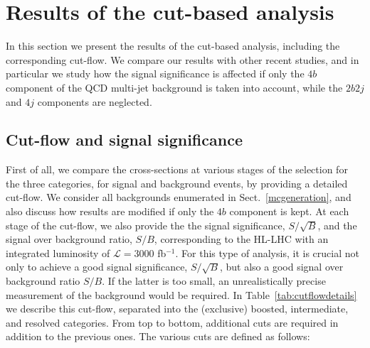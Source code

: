 
\section{Results of the cut-based analysis}

\label{sec:results}

In this section we present the results of the 
cut-based analysis, including the corresponding
cut-flow.
We
compare our results with other recent studies,
and in particular
we study how the signal significance
is affected if only the $4b$ component of the
QCD multi-jet background is taken into account,
while the $2b2j$ and $4j$ components are neglected.
%


\subsection{Cut-flow and signal significance}

First of all, we compare the cross-sections at various
stages of the selection
for the three categories, for signal and background events,
by providing a detailed cut-flow.
%
We consider all backgrounds enumerated in Sect.~\ref{mcgeneration},
and also discuss how results are modified if only the $4b$
component is kept.
%
At each stage of the cut-flow, we also provide the
the signal significance, $S/\sqrt{B}$, and the signal
over background ratio, $S/B$, corresponding to the
 HL-LHC with
an integrated luminosity of $\mathcal{L}
=3000$ fb$^{-1}$.
%
For this type of analysis,
it is crucial not only to achieve a good signal
significance, $S/\sqrt{B}$, but also a good signal over background ratio $S/B$.
%
If the latter is too small, an unrealistically precise
measurement of the background would be required.
%
In Table~\ref{tab:cutflowdetails}
we describe this cut-flow,
separated into the (exclusive) boosted, intermediate,
    and resolved categories.
    From top to bottom, additional cuts are required in addition
    to the previous ones.
    The various cuts
    are defined as follows:

   

